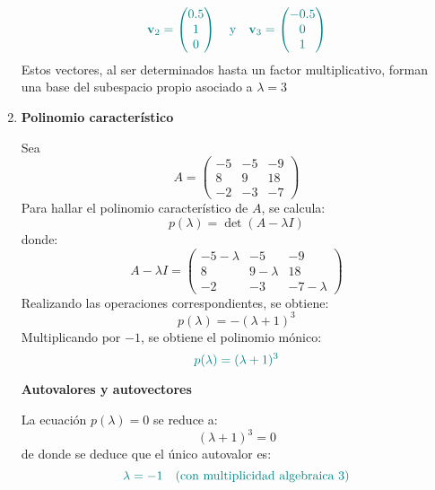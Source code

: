 \documentclass{article}
\begin{document}
\begin{enumerate}[label=\textbf{\alph*)}]
\[
\color{teal}
\mathbf{v}_2 =
\begin{pmatrix}
0.5\\
1\\
0
\end{pmatrix}
\quad\text{y}\quad
\mathbf{v}_3 =
\begin{pmatrix}
-0.5\\
0\\
1
\end{pmatrix}
\]
Estos vectores, al ser determinados hasta un factor multiplicativo, forman una base del subespacio propio asociado a \(\lambda = 3\)

\item \textbf{Polinomio característico}

Sea
\[
A =
\begin{pmatrix}
-5 & -5 & -9\\
8 & 9 & 18\\
-2 & -3 & -7
\end{pmatrix}
\]
Para hallar el polinomio característico de \(A\), se calcula:
\[
p(\lambda) = \det(A-\lambda I)
\]
donde:
\[
A - \lambda I =
\begin{pmatrix}
-5-\lambda & -5 & -9\\
8 & 9-\lambda & 18\\
-2 & -3 & -7-\lambda
\end{pmatrix}
\]
Realizando las operaciones correspondientes, se obtiene:
\[
p(\lambda) = -(\lambda+1)^3
\]
Multiplicando por \(-1\), se obtiene el polinomio mónico:
\[
\color{teal}
p(\lambda) = (\lambda+1)^3
\]

\textbf{Autovalores y autovectores}

La ecuación \(p(\lambda) = 0\) se reduce a:
\[
(\lambda+1)^3 = 0
\]
de donde se deduce que el único autovalor es:
\[
\color{teal}
\lambda = -1
\quad\text{(con multiplicidad algebraica \(3\))}
\]


\end{enumerate}
\end{document}
